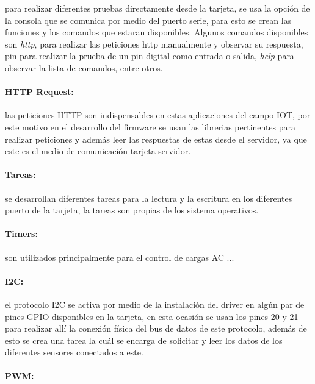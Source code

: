 para realizar diferentes pruebas directamente desde la tarjeta, se usa la opción de la consola que se comunica por medio del puerto serie, para esto se crean las funciones y los comandos que estaran disponibles. Algunos comandos disponibles son \textit{http}, para realizar las peticiones http manualmente y observar su respuesta, pin para realizar la prueba de un pin digital como entrada o salida, \textit{help} para observar la lista de comandos, entre otros.

\paragraph{HTTP Request:}

las peticiones HTTP son indispensables en estas aplicaciones del campo IOT, por este motivo en el desarrollo del firmware se usan las librerias pertinentes para realizar peticiones y además leer las respuestas de estas desde el servidor, ya que este es el medio de comunicación tarjeta-servidor.

\paragraph{Tareas:}

se desarrollan diferentes tareas para la lectura y la escritura en los diferentes puerto de la tarjeta, la tareas son propias de los sistema operativos.

\paragraph{Timers:}

son utilizados principalmente para el control de cargas AC ...

\paragraph{I2C:}

el protocolo I2C se activa por medio de la instalación del driver en algún par de pines GPIO disponibles en la tarjeta, en esta ocasión se usan los pines 20 y 21 para realizar allí la conexión física del bus de datos de este protocolo, además de esto se crea una tarea la cuál se encarga de solicitar y leer los datos de los diferentes sensores conectados a este.

\paragraph{PWM:}

